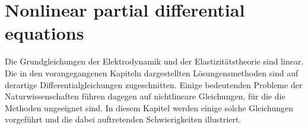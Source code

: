 %
%
%
\chapter{Nonlinear partial differential equations
\label{chapter:nichtlinear}}
\rhead{}
Die Grundgleichungen der Elektrodynamik und der Elastizitätstheorie
sind linear. Die in den vorangegangenen Kapiteln dargestellten
Lösungensmethoden sind auf derartige Differentialgleichungen
zugeschnitten. Einige bedeutenden Probleme der Naturwissenschaften
führen dagegen auf nichtlineare Gleichungen, für die die
Methoden ungeeignet sind. In diesem Kapitel werden einige
solche Gleichungen vorgeführt und die dabei auftretenden
Schwierigkeiten illustriert.








